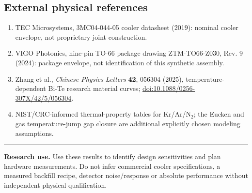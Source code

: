 \documentclass[10pt,a4paper]{article}
\begin{document}
\subsection{External physical references}
\begin{enumerate}\setlength{\itemsep}{2pt}
\item TEC Microsystems, 3MC04-044-05 cooler datasheet (2019): nominal cooler envelope, not proprietary joint construction.
\item VIGO Photonics, nine-pin TO-66 package drawing ZTM-TO66-Z030, Rev. 9 (2024): package envelope, not identification of this synthetic assembly.
\item Zhang et al., \emph{Chinese Physics Letters} \textbf{42}, 056304 (2025), temperature-dependent Bi-Te research material curves; \href{https://doi.org/10.1088/0256-307X/42/5/056304}{doi:10.1088/0256-307X/42/5/056304}.
\item NIST/CRC-informed thermal-property tables for Kr/Ar/N$_2$; the Eucken and gas temperature-jump gap closure are additional explicitly chosen modeling assumptions.
\end{enumerate}
\vfill{\color{navy}\rule{\linewidth}{1pt}}
{\small \textbf{Research use.} Use these results to identify design sensitivities and plan hardware measurements. Do not infer commercial cooler specifications, a measured backfill recipe, detector noise/response or absolute performance without independent physical qualification.}
\end{document}
